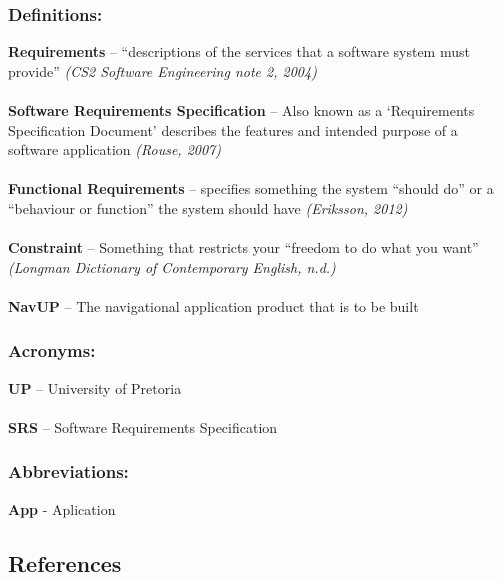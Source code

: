 \documentclass[12pt]{article}
\begin{document}
		\subsubsection{Definitions:}
		\textbf{Requirements} – “descriptions of the services that a software system must provide” \textit{(CS2 Software Engineering note 2, 2004)} \\
		\\ \textbf{Software Requirements Specification} – Also known as a ‘Requirements Specification Document’ describes the features and intended purpose of a software application \textit{(Rouse, 2007)} \\
		\\ \textbf{Functional Requirements} – specifies something the system “should do” or a “behaviour or function” the system should have \textit{(Eriksson, 2012)} \\
		\\ \textbf{Constraint} – Something that restricts your “freedom to do what you want” \textit{(Longman Dictionary of Contemporary English, n.d.)} \\
		\\ \textbf{NavUP} – The navigational application product that is to be built


		\subsubsection{Acronyms:}
		\textbf{UP} – University of Pretoria\\
		\\ \textbf{SRS} – Software Requirements Specification


		\subsubsection{Abbreviations:}
		\textbf{App} - Aplication


	\subsection{References}
\end{document}
